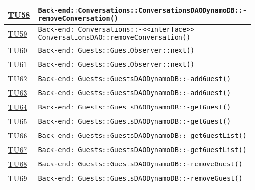 \begin{longtable}{|>{\centering}m{1cm}|m{12cm}<{\centering}|}
\hyperlink{TU58}{TU58} & \texttt{Back-end::Conversations::ConversationsDAODynamoDB::-\linebreak removeConversation()}\\ \hline

\hyperlink{TU59}{TU59} & \texttt{Back-end::Conversations::-\linebreak <<interface>> ConversationsDAO::removeConversation()}\\ \hline

\hyperlink{TU60}{TU60} & \texttt{Back-end::Guests::GuestObserver::next()}\\ \hline

\hyperlink{TU61}{TU61} & \texttt{Back-end::Guests::GuestObserver::next()}\\ \hline

\hyperlink{TU62}{TU62} & \texttt{Back-end::Guests::GuestsDAODynamoDB::-\linebreak addGuest()}\\ \hline

\hyperlink{TU63}{TU63} & \texttt{Back-end::Guests::GuestsDAODynamoDB::-\linebreak addGuest()}\\ \hline

\hyperlink{TU64}{TU64} & \texttt{Back-end::Guests::GuestsDAODynamoDB::-\linebreak getGuest()}\\ \hline

\hyperlink{TU65}{TU65} & \texttt{Back-end::Guests::GuestsDAODynamoDB::-\linebreak getGuest()}\\ \hline

\hyperlink{TU66}{TU66} & \texttt{Back-end::Guests::GuestsDAODynamoDB::-\linebreak getGuestList()}\\ \hline

\hyperlink{TU67}{TU67} & \texttt{Back-end::Guests::GuestsDAODynamoDB::-\linebreak getGuestList()}\\ \hline

\hyperlink{TU68}{TU68} & \texttt{Back-end::Guests::GuestsDAODynamoDB::-\linebreak removeGuest()}\\ \hline

\hyperlink{TU69}{TU69} & \texttt{Back-end::Guests::GuestsDAODynamoDB::-\linebreak removeGuest()}\\ \hline


\end{longtable}
